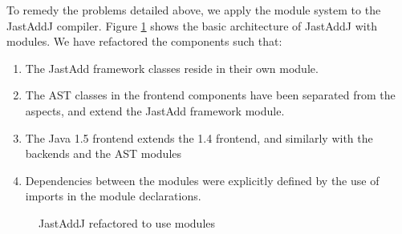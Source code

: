 To remedy the problems detailed above, we apply the module system to
the JastAddJ compiler. Figure \ref{ModuleMainComponents} shows the basic
architecture of JastAddJ with modules. We have refactored the components such that:

\begin{enumerate}
\item {The JastAdd framework classes reside in their own module.}
\item {The AST classes in the frontend components have been separated from the aspects, and extend the JastAdd framework module.}
\item {The Java 1.5 frontend extends the 1.4 frontend, and similarly with the backends and the AST modules}
\item {Dependencies between the modules were explicitly defined by the use of imports in the module declarations.}
	
\end{enumerate}

\begin{figure}[htb!]
  \begin{center}
    \caption{JastAddJ refactored to use modules}
    \label{ModuleMainComponents}
  \end{center}
\end{figure}

